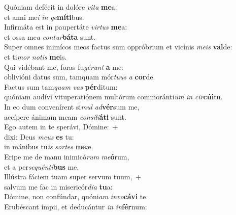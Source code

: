 \evenverse Quóniam defécit in dolóre \textit{vi}\textit{ta} \textbf{me}a:~\*\\
\evenverse et anni me\textit{i} \textit{in} \textit{ge}\textbf{mí}\textbf{ti}bus.\\
\oddverse Infirmáta est in paupertáte \textit{vir}\textit{tus} \textbf{me}a:~\*\\
\oddverse et ossa me\textit{a} \textit{con}\textit{tur}\textbf{bá}\textbf{ta} sunt.\\
\evenverse Super omnes inimícos meos factus sum oppróbrium et vicínis \textit{me}\textit{is} \textbf{val}de:~\*\\
\evenverse et ti\textit{mor} \textit{no}\textit{tis} \textbf{me}is.\\
\oddverse Qui vidébant me, foras fu\textit{gé}\textit{runt} \textbf{a} me:~\*\\
\oddverse oblivióni datus sum, tamquam mór\textit{tu}\textit{us} \textit{a} \textbf{cor}de.\\
\evenverse Factus sum tam\textit{quam} \textit{vas} \textbf{pér}ditum:~\*\\
\evenverse quóniam audívi vituperatiónem multórum commoránti\textit{um} \textit{in} \textit{cir}\textbf{cú}\textbf{i}tu.\\
\oddverse In eo dum convenírent si\textit{mul} \textit{ad}\textbf{vér}sum me,~\*\\
\oddverse accípere ánimam meam \textit{con}\textit{si}\textit{li}\textbf{á}\textbf{ti} sunt.\\
\evenverse Ego autem in te sperávi, Dómine:~+\\
\evenverse  dixi: Deus \textit{me}\textit{us} \textbf{es} tu:~\*\\
\evenverse in mánibus tu\textit{is} \textit{sor}\textit{tes} \textbf{me}æ.\\
\oddverse Eripe me de manu inimicó\textit{rum} \textit{me}\textbf{ó}rum,~\*\\
\oddverse et a per\textit{se}\textit{quén}\textit{ti}\textbf{bus} me.\\
\evenverse Illústra fáciem tuam super servum tuum,~+\\
\evenverse  salvum me fac in misericór\textit{di}\textit{a} \textbf{tu}a:~\*\\
\evenverse Dómine, non confúndar, quóni\textit{am} \textit{in}\textit{vo}\textbf{cá}\textbf{vi} te.\\
\oddverse Erubéscant ímpii, et deducántur \textit{in} \textit{in}\textbf{fér}num:~\*\\
